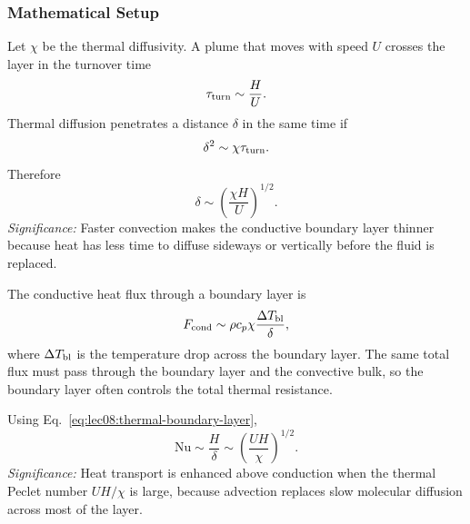 \subsubsection*{Mathematical Setup}
Let $\chi$ be the thermal diffusivity. A plume that moves with speed $U$ crosses
the layer in the turnover time
\begin{equation}
    \tau_{\rm turn}\sim\frac{H}{U}.
    \label{eq:lec08:turnover-time}
\end{equation}
Thermal diffusion penetrates a distance $\delta$ in the same time if
\begin{equation}
    \delta^2\sim \chi\tau_{\rm turn}.
    \label{eq:lec08:boundary-layer-diffusion-step}
\end{equation}
Therefore
\begin{equation}
    \boxed{
    \delta\sim\left(\frac{\chi H}{U}\right)^{1/2}.
    }
    \label{eq:lec08:thermal-boundary-layer}
\end{equation}
\textit{Significance:} Faster convection makes the conductive boundary layer
thinner because heat has less time to diffuse sideways or vertically before the
fluid is replaced.

The conductive heat flux through a boundary layer is
\begin{equation}
    F_{\rm cond}
    \sim
    \rho c_p\chi\frac{\Delta T_{\rm bl}}{\delta},
    \label{eq:lec08:boundary-layer-flux}
\end{equation}
where $\Delta T_{\rm bl}$ is the temperature drop across the boundary layer.
The same total flux must pass through the boundary layer and the convective
bulk, so the boundary layer often controls the total thermal resistance.


Using Eq.~\eqref{eq:lec08:thermal-boundary-layer},
\begin{equation}
    \boxed{
    \mathrm{Nu}\sim\frac{H}{\delta}
    \sim
    \left(\frac{UH}{\chi}\right)^{1/2}.
    }
    \label{eq:lec08:nusselt-peclet}
\end{equation}
\textit{Significance:} Heat transport is enhanced above conduction when the
thermal Peclet number $UH/\chi$ is large, because advection replaces slow
molecular diffusion across most of the layer.

